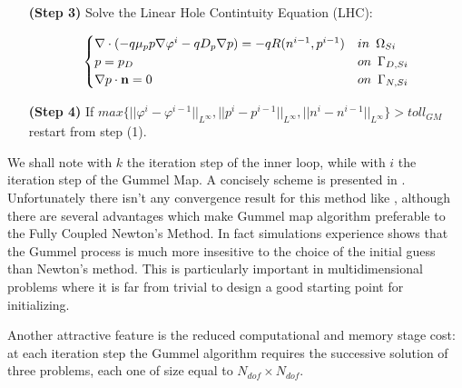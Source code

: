 \begin{itemize}
\item[\bf (Step 3)] Solve the Linear Hole Contintuity Equation (LHC):

\begin{equation}
\label{eq: LHC system}
\begin{cases}
\nabla \cdot (- q\mu_p p \nabla \varphi^i - qD_p \nabla p ) =  -qR(n^{i-1},p^{i-1}) & in \psp{3} \Omega_{Si}
\\
 p = p_D & on \psp{3} \Gamma_{D,Si}
 \\
 \nabla p \cdot \vect{n} = 0 & on \psp{3} \Gamma_{N,Si}
\end{cases}
\end{equation}

\item[\bf (Step 4)] If $max\{||\varphi^i-\varphi^{i-1}||_{L^{\infty}},||p^i-p^{i-1}||_{L^{\infty}},||n^i-n^{i-1}||_{L^{\infty}}\}>toll_{GM}$ restart from step (1).


\end{itemize}


We shall note with $k$ the iteration step of the inner loop, while with $i$ the iteration step of the Gummel Map. A concisely scheme is presented in .
Unfortunately there isn't any convergence result for this method like , although there are several advantages which make Gummel map algorithm preferable to the Fully Coupled Newton's Method.
In fact simulations experience shows that the Gummel process is much more insesitive to the choice of the initial guess than Newton's method. This is particularly important in multidimensional problems where it is far from trivial to design a good starting point for initializing.

Another attractive feature is the reduced computational and memory stage cost: at each iteration step the Gummel algorithm requires the successive solution of three problems, each one of size equal to $N_{dof}\times N_{dof}$.





